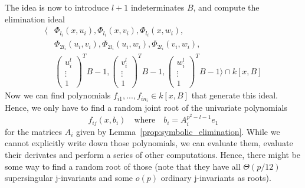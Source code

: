 The idea is now to introduce $l + 1$ indeterminates $B$, and compute the elimination ideal
\begin{align*}
    \langle &\Phi_{l_i}(x, u_i), \Phi_{l_i}(x, v_i), \Phi_{l_i}(x, w_i), \\
    &\Phi_{2l_i}(u_i, v_i), \Phi_{2l_i}(u_i, w_i), \Phi_{2l_i}(v_i, w_i), \\
    &\left(\begin{matrix*}
        u_i^l \\
        \vdots \\
        1
    \end{matrix*}\right)^T B - 1, \left(\begin{matrix*}
        v_i^l \\
        \vdots \\
        1
    \end{matrix*}\right)^T B - 1, \left(\begin{matrix*}
        w_i^l \\
        \vdots \\
        1
    \end{matrix*}\right)^T B - 1 \rangle \cap k[x, B]
\end{align*}
Now we can find polynomials $f_{i1}, ..., f_{in_i} \in k[x, B]$ that generate this ideal.
Hence, we only have to find a random joint root of the univariate polynomials
\begin{equation*}
    f_{ij}(x, b_i) \quad \text{where} \quad b_i = A_i^{p^2 - l - 1} e_1
\end{equation*}
for the matrices $A_i$ given by Lemma~\ref{prop:symbolic_elimination}.
While we cannot explicitly write down those polynomials, we can evaluate them, evaluate their derivates and perform a series of other computations.
Hence, there might be some way to find a random root of those (note that they have all $\Theta(p/12)$ supersingular j-invariants and some $o(p)$ ordinary j-invariants as roots).